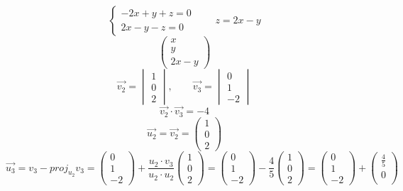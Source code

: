 \begin{itemize}
$$\begin{cases}
    	-2x + y + z = 0 \\
        2x - y - z = 0
    \end{cases} \qquad z = 2x - y $$
    $$
    \begin{pmatrix}
    	x \\
        y \\
        2x - y
    \end{pmatrix} $$
    $$ \vec{v_2} =
    \begin{vmatrix}
    	1 \\
        0 \\
        2
    \end{vmatrix}, \qquad \vec{v_3} =
    \begin{vmatrix}
    	0 \\
        1 \\
        -2
    \end{vmatrix} $$
    $$ \vec{v_2} \cdot \vec{v_3} = -4 $$
    $$ \vec{u_2} = \vec{v_2} =
    \begin{pmatrix}
    	1 \\
        0 \\
        2
    \end{pmatrix} $$
    $$ \vec{u_3} = v_3 - proj_{u_2} v_3 =
    \begin{pmatrix}
    	0 \\
        1 \\
        -2
    \end{pmatrix} + \frac{u_2 \cdot v_3}{u_2 \cdot u_2}
    \begin{pmatrix}
    	1 \\
        0 \\
        2
    \end{pmatrix} =
    \begin{pmatrix}
    	0 \\
        1 \\
        -2
    \end{pmatrix} - \frac{4}{5}
    \begin{pmatrix}
    	1 \\
        0 \\
        2
    \end{pmatrix} =
    \begin{pmatrix}
    	0 \\
        1 \\
        -2
    \end{pmatrix} +
    \begin{pmatrix}
    	\frac45 \\
        0 \\

\end{pmatrix}$$
\end{itemize}
